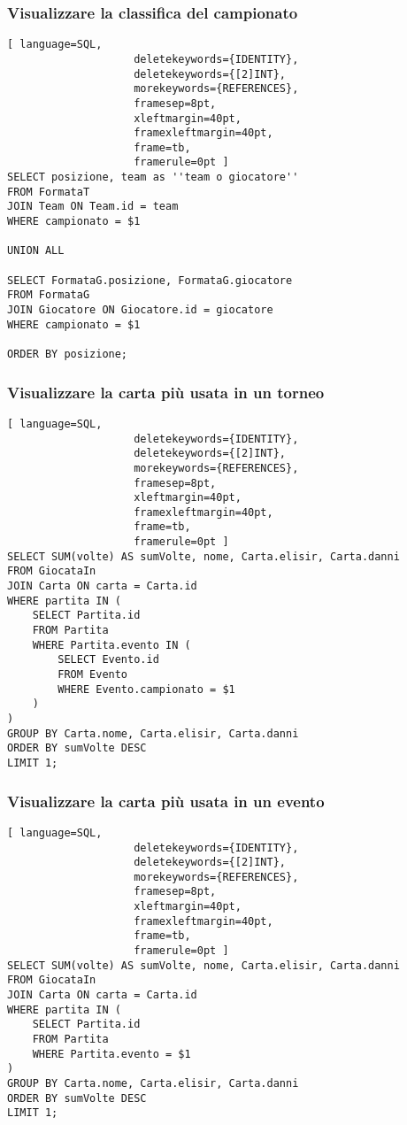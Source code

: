 \documentclass{article}
\begin{document}
\subsubsection{Visualizzare la classifica del campionato}
\begin{lstlisting}[ language=SQL,
                    deletekeywords={IDENTITY},
                    deletekeywords={[2]INT},
                    morekeywords={REFERENCES},
                    framesep=8pt,
                    xleftmargin=40pt,
                    framexleftmargin=40pt,
                    frame=tb,
                    framerule=0pt ]
SELECT posizione, team as ''team o giocatore''
FROM FormataT
JOIN Team ON Team.id = team
WHERE campionato = $1

UNION ALL

SELECT FormataG.posizione, FormataG.giocatore
FROM FormataG
JOIN Giocatore ON Giocatore.id = giocatore
WHERE campionato = $1

ORDER BY posizione;
\end{lstlisting}

\subsubsection{Visualizzare la carta più usata in un torneo}
\begin{lstlisting}[ language=SQL,
                    deletekeywords={IDENTITY},
                    deletekeywords={[2]INT},
                    morekeywords={REFERENCES},
                    framesep=8pt,
                    xleftmargin=40pt,
                    framexleftmargin=40pt,
                    frame=tb,
                    framerule=0pt ]
SELECT SUM(volte) AS sumVolte, nome, Carta.elisir, Carta.danni
FROM GiocataIn
JOIN Carta ON carta = Carta.id
WHERE partita IN (
    SELECT Partita.id
    FROM Partita
    WHERE Partita.evento IN (
        SELECT Evento.id
        FROM Evento
        WHERE Evento.campionato = $1
    )
)
GROUP BY Carta.nome, Carta.elisir, Carta.danni
ORDER BY sumVolte DESC
LIMIT 1;
\end{lstlisting}

\subsubsection{Visualizzare la carta più usata in un evento}
\begin{lstlisting}[ language=SQL,
                    deletekeywords={IDENTITY},
                    deletekeywords={[2]INT},
                    morekeywords={REFERENCES},
                    framesep=8pt,
                    xleftmargin=40pt,
                    framexleftmargin=40pt,
                    frame=tb,
                    framerule=0pt ]
SELECT SUM(volte) AS sumVolte, nome, Carta.elisir, Carta.danni
FROM GiocataIn
JOIN Carta ON carta = Carta.id
WHERE partita IN (
    SELECT Partita.id
    FROM Partita
    WHERE Partita.evento = $1
)
GROUP BY Carta.nome, Carta.elisir, Carta.danni
ORDER BY sumVolte DESC
LIMIT 1;
\end{lstlisting}
\end{document}
